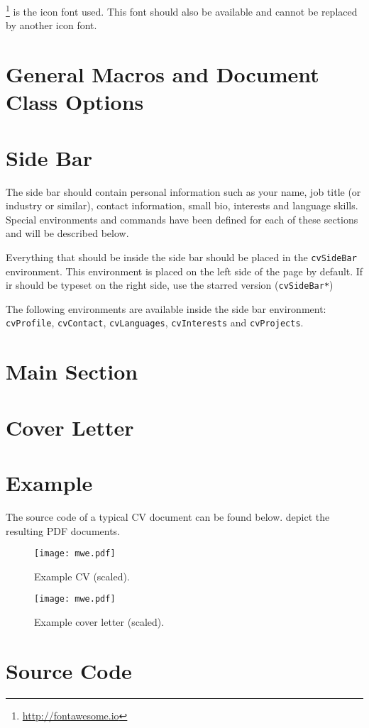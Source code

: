 \documentclass{article}
\begin{document}
  \footnote{\url{http://fontawesome.io}} is the icon font used. This font should also be available and cannot be replaced by another icon font. 

\section{General Macros and Document Class Options}

\section{Side Bar}

  The side bar should contain personal information such as your name, job title (or industry or similar), contact information, small bio, interests and language skills. Special environments and commands have been defined for each of these sections and will be described below. 

  Everything that should be inside the side bar should be placed in the \lstinline|cvSideBar| environment. This environment is placed on the left side of the page by default. If ir should be typeset on the right side, use the starred version (\lstinline|cvSideBar*|)

  The following environments are available inside the side bar environment: \lstinline|cvProfile|, \lstinline|cvContact|, \lstinline|cvLanguages|, \lstinline|cvInterests| and \lstinline|cvProjects|.

\section{Main Section}

\section{Cover Letter}

\section{Example}

  The source code of a typical CV document can be found below.  depict the resulting PDF documents.

  \begin{figure}[!ht]
    \texttt{[image: mwe.pdf]}
    \caption{Example CV (scaled).}
    \label{example-cv}
  \end{figure}

  \begin{figure}[!ht]
    \texttt{[image: mwe.pdf]}
    \caption{Example cover letter (scaled).}
    \label{example-cover-letter}
  \end{figure}

  

\section{Source Code}


\end{document}
